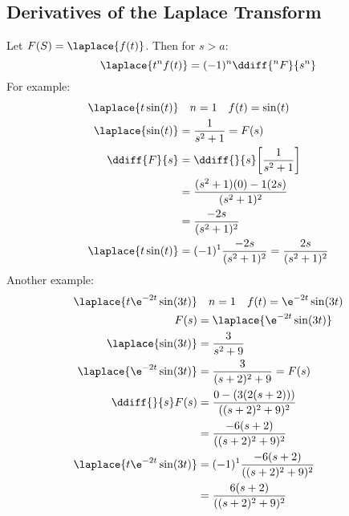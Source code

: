 \documentclass{math}
\begin{document}
\subsection*{Derivatives of the Laplace Transform}
Let \( F(S) = \laplace{f(t)} \). Then for \( s>a \):
\[ \laplace{t^nf(t)} = (-1)^n\ddiff{^nF}{s^n} \]
For example:
\begin{align*}
  \laplace{t\sin(t)} & \quad n = 1 \quad f(t) = \sin(t) \\
  \laplace{\sin(t)} &= \frac{1}{s^2+1} = F(s) \\
  \ddiff{F}{s} &= \ddiff{}{s}\bigg[\frac{1}{s^2+1}\bigg] \\
  &= \frac{(s^2+1)(0)-1(2s)}{(s^2+1)^2} \\
  &= \frac{-2s}{(s^2+1)^2} \\
  \laplace{t\sin(t)} &= (-1)^1\frac{-2s}{(s^2+1)^2} = \frac{2s}{(s^2+1)^2}
\end{align*}
Another example:
\begin{align*}
  \laplace{t\e^{-2t}\sin(3t)} & \quad n = 1 \quad f(t) = \e^{-2t}\sin(3t) \\
  F(s) &= \laplace{\e^{-2t}\sin(3t)} \\
  \laplace{\sin(3t)} &= \frac{3}{s^2+9} \\
  \laplace{\e^{-2t}\sin(3t)} &= \frac{3}{(s+2)^2+9} = F(s) \\
  \ddiff{}{s}F(s) &= \frac{0-(3(2(s+2)))}{((s+2)^2+9)^2} \\
  &= \frac{-6(s+2)}{((s+2)^2+9)^2} \\
  \laplace{t\e^{-2t}\sin(3t)} &= (-1)^1\frac{-6(s+2)}{((s+2)^2+9)^2} \\
  &= \frac{6(s+2)}{((s+2)^2+9)^2} \\
\end{align*}
\end{document}
